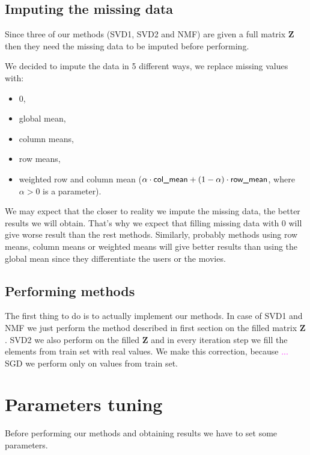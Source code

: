 \documentclass[10pt]{amsart}
\newcommand{\tami}[1]{{\textcolor{magenta}{#1}}}
\begin{document}
\subsection*{Imputing the missing data}

Since three of our methods (SVD1, SVD2 and NMF) are given a full matrix $\boldsymbol{Z}$ then they need the missing data to be imputed before performing.

We decided to impute the data in 5 different ways, we replace missing values with:
\begin{itemize}
    \item 0,
    \item global mean,
    \item column means,
    \item row means,
    \item weighted row and column mean ($\alpha \cdot \text{\textsf{col\_mean}} + (1-\alpha) \cdot \text{\textsf{row\_mean}}$, where $\alpha>0$ is a parameter).
\end{itemize}

We may expect that the closer to reality we impute the missing data, the better results we will obtain.
That's why we expect that filling missing data with 0 will give worse result than the rest methods.
Similarly, probably methods using row means, column means or weighted means will give better results than using the global mean since they differentiate the users or the movies.

\subsection*{Performing methods}

The first thing to do is to actually implement our methods.
In case of SVD1 and NMF we just perform the method described in first section on the filled matrix $\boldsymbol{Z}$.
SVD2 we also perform on the filled $\boldsymbol{Z}$ and in every iteration step we fill the elements from train set with real values.
We make this correction, because \tami{...}
SGD we perform only on values from train set.




\section{Parameters tuning}

Before performing our methods and obtaining results we have to set some parameters.
\end{document}
